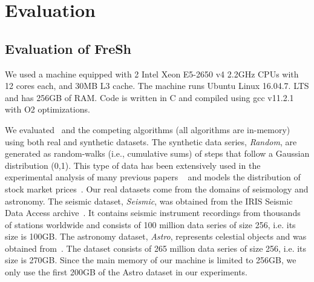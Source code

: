
\chapter{Evaluation}
\label{chapter:Evaluation}

\section{Evaluation of FreSh}

% 
We used a machine equipped with 2 Intel  Xeon E5-2650 v4 2.2GHz
CPUs with 12 cores each, and 30MB L3 cache. The machine runs
Ubuntu Linux 16.04.7. LTS and has 256GB of RAM. Code is written in C and
compiled using gcc v11.2.1 with O2 optimizations.

We evaluated \Fresh\ and the competing algorithms (all algorithms are in-memory)
using both real and synthetic datasets.
The synthetic data series, \emph{Random}, are generated as random-walks
(i.e., cumulative sums) of steps that follow a Gaussian distribution (0,1).
This type of data has been extensively used in the experimental analysis of many 
previous papers
~\cite{conf/sigmod/Faloutsos1994,isax2plus,conf/kdd/Zoumpatianos2015,DBLP:journals/vldb/ZoumpatianosLIP18,DBLP:journals/pvldb/EchihabiZPB18,DBLP:journals/pvldb/EchihabiZPB19}
and models the distribution of stock market prices~\cite{conf/sigmod/Faloutsos1994}.
Our real datasets come from the domains of seismology and astronomy.
The seismic dataset, \emph{Seismic}, was obtained from the IRIS Seismic Data Access
archive~\cite{url/data/seismic}. It contains seismic instrument recordings from
thousands of stations worldwide and consists of 100 million data series of size 256,
i.e. its size is 100GB. 
The astronomy dataset, \emph{Astro}, represents celestial objects and was obtained 
from~\cite{journal/aa/soldi2014}. The dataset consists of 265 million data series of
size 256, i.e. its size is 270GB.
% 
Since the main memory of our machine is limited to 256GB, we only use the first 200GB
of the Astro dataset in our experiments.

